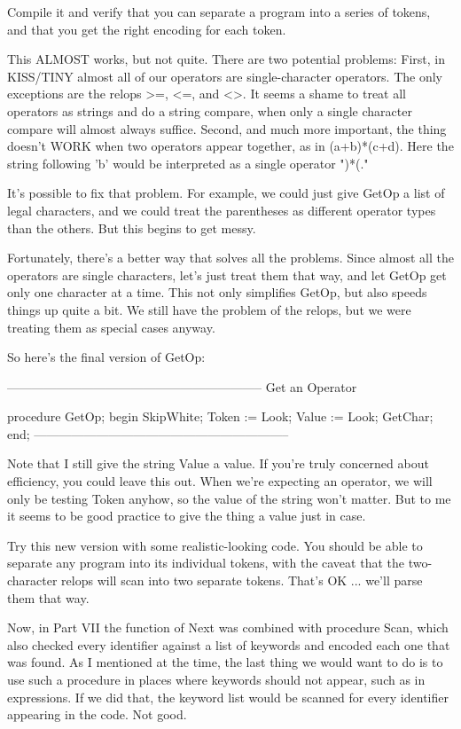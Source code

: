 \documentclass[float=false, crop=false]{standalone}
\begin{document}
Compile it and verify that you can separate a program into a series of tokens,
and that you get the right encoding for each token.

This ALMOST works, but not quite. There are two potential problems: First, in
KISS/TINY almost all of our operators are single-character operators. The only
exceptions are the relops >=, <=, and <>. It seems a shame to treat all
operators as strings and do a string compare, when only a single character
compare will almost always suffice. Second, and much more important, the thing
doesn't WORK when two operators appear together, as in (a+b)*(c+d). Here the
string following 'b' would be interpreted as a single operator ")*(."

It's possible to fix that problem. For example, we could just give GetOp a list
of legal characters, and we could treat the parentheses as different operator
types than the others. But this begins to get messy.

Fortunately, there's a better way that solves all the problems. Since almost all
the operators are single characters, let's just treat them that way, and let
GetOp get only one character at a time. This not only simplifies GetOp, but also
speeds things up quite a bit. We still have the problem of the relops, but we
were treating them as special cases anyway.

So here's the final version of GetOp:

\begin{code}
{--------------------------------------------------------------}
{ Get an Operator }

procedure GetOp;
begin
   SkipWhite;
   Token := Look;
   Value := Look;
   GetChar;
end;
{--------------------------------------------------------------}
\end{code}

Note that I still give the string Value a value. If you're truly concerned about
efficiency, you could leave this out. When we're expecting an operator, we will
only be testing Token anyhow, so the value of the string won't matter. But to me
it seems to be good practice to give the thing a value just in case.

Try this new version with some realistic-looking code. You should be able to
separate any program into its individual tokens, with the caveat that the
two-character relops will scan into two separate tokens. That's OK ... we'll
parse them that way.

Now, in Part VII the function of Next was combined with procedure Scan, which
also checked every identifier against a list of keywords and encoded each one
that was found. As I mentioned at the time, the last thing we would want to do
is to use such a procedure in places where keywords should not appear, such as
in expressions. If we did that, the keyword list would be scanned for every
identifier appearing in the code. Not good.
\end{document}
